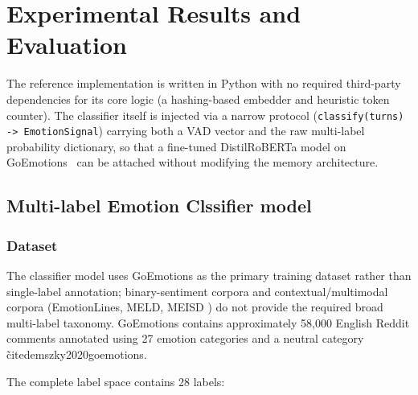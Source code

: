 \documentclass[graybox]{svmult}
\begin{document}
\section{Experimental Results and Evaluation}

The reference implementation is written in Python with no required
third-party dependencies for its core logic (a hashing-based embedder and
heuristic token counter). The
classifier itself is injected via a narrow protocol
(\texttt{classify(turns) -> EmotionSignal}) carrying both a VAD vector
and the raw multi-label probability dictionary, so that a
fine-tuned DistilRoBERTa model on
GoEmotions~\cite{sanh2019distilbert,liu2019roberta,demszky2020goemotions}
can be attached without modifying the memory architecture. 

\subsection{Multi-label Emotion Clssifier model}

\subsubsection{Dataset}

The classifier model uses GoEmotions as the primary training dataset rather than single-label annotation; binary-sentiment corpora and contextual/multimodal corpora (EmotionLines, MELD, MEISD \cite{chen2018emotionlines,poria2019meld,zhang2020meisd}) do not provide the required broad multi-label taxonomy. GoEmotions contains approximately 58,000 English Reddit comments annotated using 27 emotion categories and a neutral category \~cite{demszky2020goemotions}.

The complete label space contains 28 labels:
\end{document}
